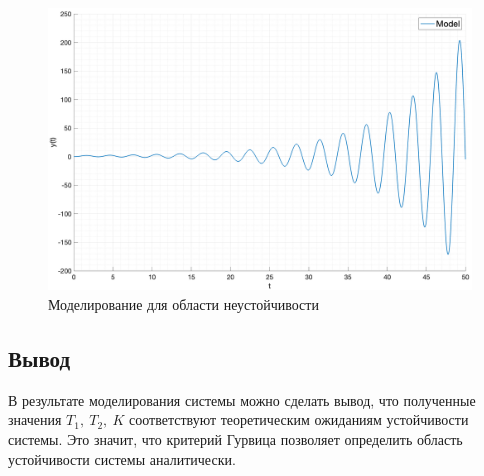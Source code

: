 \begin{figure}[ht!]
    \centering
    \includegraphics[width=\textwidth]{media/case9.png}
    \caption{Моделирование для области неустойчивости}
    \label{fig:case9}
\end{figure}

\subsection{Вывод}
В результате моделирования системы можно сделать вывод, 
что полученные значения $T_1,~T_2,~K$ соответствуют теоретическим ожиданиям устойчивости системы.
Это значит, что критерий Гурвица позволяет определить область устойчивости системы аналитически. 